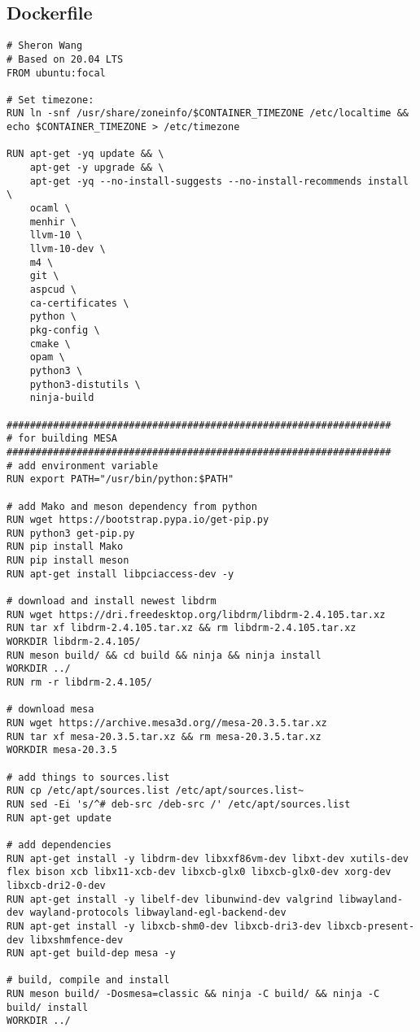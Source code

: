 \documentclass[main.tex]{subfiles}
\begin{document}
\subsection{Dockerfile}
\begin{lstlisting}
# Sheron Wang
# Based on 20.04 LTS
FROM ubuntu:focal

# Set timezone:
RUN ln -snf /usr/share/zoneinfo/$CONTAINER_TIMEZONE /etc/localtime && echo $CONTAINER_TIMEZONE > /etc/timezone

RUN apt-get -yq update && \
    apt-get -y upgrade && \
    apt-get -yq --no-install-suggests --no-install-recommends install \
    ocaml \
    menhir \
    llvm-10 \
    llvm-10-dev \
    m4 \
    git \
    aspcud \
    ca-certificates \
    python \
    pkg-config \
    cmake \
    opam \
    python3 \
    python3-distutils \
    ninja-build

##################################################################
# for building MESA
##################################################################
# add environment variable
RUN export PATH="/usr/bin/python:$PATH"

# add Mako and meson dependency from python
RUN wget https://bootstrap.pypa.io/get-pip.py
RUN python3 get-pip.py
RUN pip install Mako
RUN pip install meson
RUN apt-get install libpciaccess-dev -y

# download and install newest libdrm
RUN wget https://dri.freedesktop.org/libdrm/libdrm-2.4.105.tar.xz
RUN tar xf libdrm-2.4.105.tar.xz && rm libdrm-2.4.105.tar.xz
WORKDIR libdrm-2.4.105/
RUN meson build/ && cd build && ninja && ninja install
WORKDIR ../
RUN rm -r libdrm-2.4.105/

# download mesa
RUN wget https://archive.mesa3d.org//mesa-20.3.5.tar.xz
RUN tar xf mesa-20.3.5.tar.xz && rm mesa-20.3.5.tar.xz
WORKDIR mesa-20.3.5

# add things to sources.list
RUN cp /etc/apt/sources.list /etc/apt/sources.list~
RUN sed -Ei 's/^# deb-src /deb-src /' /etc/apt/sources.list
RUN apt-get update

# add dependencies
RUN apt-get install -y libdrm-dev libxxf86vm-dev libxt-dev xutils-dev flex bison xcb libx11-xcb-dev libxcb-glx0 libxcb-glx0-dev xorg-dev libxcb-dri2-0-dev
RUN apt-get install -y libelf-dev libunwind-dev valgrind libwayland-dev wayland-protocols libwayland-egl-backend-dev
RUN apt-get install -y libxcb-shm0-dev libxcb-dri3-dev libxcb-present-dev libxshmfence-dev
RUN apt-get build-dep mesa -y

# build, compile and install
RUN meson build/ -Dosmesa=classic && ninja -C build/ && ninja -C build/ install
WORKDIR ../


\end{lstlisting}
\end{document}
